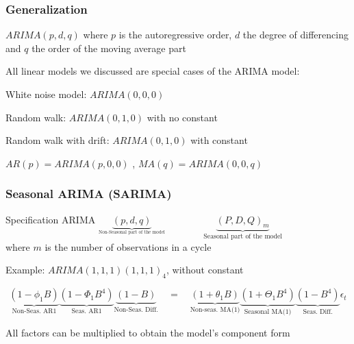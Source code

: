 \documentclass{beamer}
\newenvironment{wideitemize}{\itemize\addtolength{\itemsep}{10pt}}{\enditemize}
\begin{document}
\begin{frame}
  \frametitle{Generalization}

  \begin{wideitemize}
  \item $ARIMA(p, d, q)$ where $p$ is the autoregressive order, $d$ the degree of differencing and $q$ the order of the moving average part
  \item All linear models we discussed are special cases of the ARIMA model:
    \begin{wideitemize}
    \item White noise model: $ARIMA(0, 0, 0)$
    \item Random walk: $ARIMA(0, 1, 0)$ with no constant
    \item Random walk with drift: $ARIMA(0, 1, 0)$ with constant  
    \item $AR(p) = ARIMA(p, 0, 0)$ , $MA(q) = ARIMA(0, 0, q)$
    \end{wideitemize}
  \end{wideitemize}
    
\end{frame}

\begin{frame}
  \frametitle{Seasonal ARIMA (SARIMA)}

  \begin{block}{Specification}
    ARIMA  $ \underbrace{(p, d, q)}_{_{\text{Non-Seasonal part of the model}}} \qquad \qquad \underbrace{(P, D, Q)_m}_{\text{Seasonal part of the model}}$\\
    where $m$ is the number of observations in a cycle
  \end{block}

\medskip
\pause
    
Example: $ARIMA(1,1,1)(1,1,1)_4$, without constant

\begin{equation*}
  \underbrace{(1-\phi_1B)}_{\text{Non-Seas. AR1}} \underbrace{(1-\Phi_1B^4)}_{\text{Seas. AR1}}\underbrace{(1-B)}_{\text{Non-Seas. Diff.}} \quad = \quad \underbrace{(1+\theta_1 B)}_{\text{Non-seas. MA(1)}} \underbrace{(1+\Theta_1 B^4)}_{\text{Seasonal MA(1)}}\underbrace{(1-B^4)}_{\text{Seas. Diff.}}\epsilon_t
\end{equation*}

\medskip

  All factors can be multiplied to obtain the model's component form
\end{frame}
\end{document}
